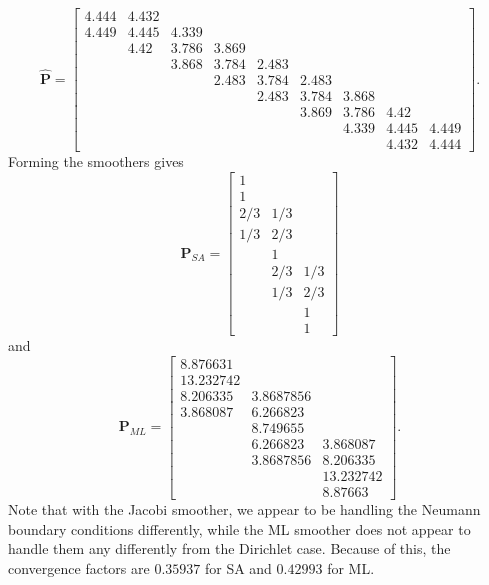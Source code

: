 \documentclass{article}
\newcommand{\mat}[1]{\bm{{#1}}}
\newcommand{\sfrac}[2]{#1/#2}
\begin{document}
\begin{equation}
\mat{\hat{P}} =  \begin{bmatrix}
4.444 & 4.432 &  &  &  &  &  &  &  \\
4.449 & 4.445 & 4.339 &  &  &  &  &  &  \\
 & 4.42 & 3.786 & 3.869 &  &  &  &  &  \\
 &  & 3.868 & 3.784 & 2.483 &  &  &  &  \\
 &  &  & 2.483 & 3.784 & 2.483 &  &  &  \\
 &  &  &  & 2.483 & 3.784 & 3.868 &  &  \\
 &  &  &  &  & 3.869 & 3.786 & 4.42 &  \\
 &  &  &  &  &  & 4.339 & 4.445 & 4.449 \\
 &  &  &  &  &  &  & 4.432 & 4.444
\end{bmatrix}.
\end{equation}
Forming the smoothers gives
\begin{equation}
\mat{P}_{SA} = \begin{bmatrix}
1 &  &  \\
1 &  &  \\
\sfrac{2}{3} & \sfrac{1}{3} &  \\
\sfrac{1}{3} & \sfrac{2}{3} &  \\
 & 1 &  \\
 & \sfrac{2}{3} & \sfrac{1}{3} \\
 & \sfrac{1}{3} & \sfrac{2}{3} \\
 &  & 1 \\
 &  & 1
\end{bmatrix}
\end{equation}
and
\begin{equation}
\mat{P}_{ML}=\begin{bmatrix}
8.876631 &  &  \\
13.232742 &  &  \\
8.206335 & 3.8687856 &  \\
3.868087 & 6.266823 &  \\
 & 8.749655 &  \\
 & 6.266823 & 3.868087 \\
 & 3.8687856 & 8.206335 \\
 &  & 13.232742 \\
 &  & 8.87663
\end{bmatrix}.
\end{equation}
Note that with the Jacobi smoother, we appear to be handling the Neumann boundary conditions differently, while the ML smoother does not appear to handle them any differently from the Dirichlet case.  Because of this, the convergence factors are $0.35937$ for SA and $0.42993$ for ML.
\end{document}
